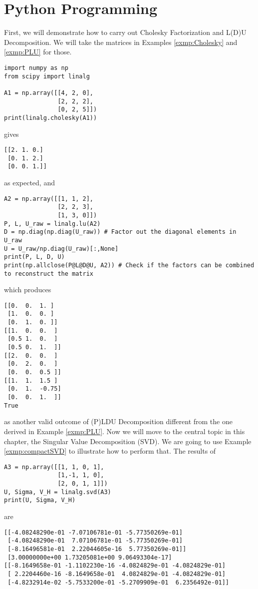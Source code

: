\section{Python Programming}
First, we will demonstrate how to carry out Cholesky Factorization and L(D)U Decomposition. We will take the matrices in Examples \ref{exmp:Cholesky} and \ref{exmp:PLU} for those.
\begin{lstlisting}
import numpy as np
from scipy import linalg

A1 = np.array([[4, 2, 0],
               [2, 2, 2],
               [0, 2, 5]])
print(linalg.cholesky(A1))
\end{lstlisting}
gives
\begin{lstlisting}
[[2. 1. 0.]
 [0. 1. 2.]
 [0. 0. 1.]]    
\end{lstlisting}
as expected, and
\begin{lstlisting}
A2 = np.array([[1, 1, 2],
               [2, 2, 3],
               [1, 3, 0]])
P, L, U_raw = linalg.lu(A2)
D = np.diag(np.diag(U_raw)) # Factor out the diagonal elements in U_raw
U = U_raw/np.diag(U_raw)[:,None]
print(P, L, D, U)
print(np.allclose(P@L@D@U, A2)) # Check if the factors can be combined to reconstruct the matrix
\end{lstlisting}
which produces
\begin{lstlisting}
[[0.  0.  1. ]
 [1.  0.  0. ]
 [0.  1.  0. ]] 
[[1.  0.  0.  ]
 [0.5 1.  0.  ]
 [0.5 0.  1.  ]] 
[[2.  0.  0.  ]
 [0.  2.  0.  ]
 [0.  0.  0.5 ]] 
[[1.  1.  1.5 ]
 [0.  1.  -0.75]
 [0.  0.  1.  ]]
True
\end{lstlisting}
as another valid outcome of (P)LDU Decomposition different from the one derived in Example \ref{exmp:PLU}. Now we will move to the central topic in this chapter, the Singular Value Decomposition (SVD). We are going to use Example \ref{exmp:compactSVD} to illustrate how to perform that. The results of
\begin{lstlisting}
A3 = np.array([[1, 1, 0, 1],
               [1,-1, 1, 0],
               [2, 0, 1, 1]])
U, Sigma, V_H = linalg.svd(A3)
print(U, Sigma, V_H)
\end{lstlisting}
are
\begin{lstlisting}
[[-4.08248290e-01 -7.07106781e-01 -5.77350269e-01]
 [-4.08248290e-01  7.07106781e-01 -5.77350269e-01]
 [-8.16496581e-01  2.22044605e-16  5.77350269e-01]] 
 [3.00000000e+00 1.73205081e+00 9.06493304e-17] 
[[-8.1649658e-01 -1.1102230e-16 -4.0824829e-01 -4.0824829e-01]
 [ 2.2204460e-16 -8.1649658e-01  4.0824829e-01 -4.0824829e-01]
 [-4.8232914e-02 -5.7533200e-01 -5.2709909e-01  6.2356492e-01]]    
\end{lstlisting}
